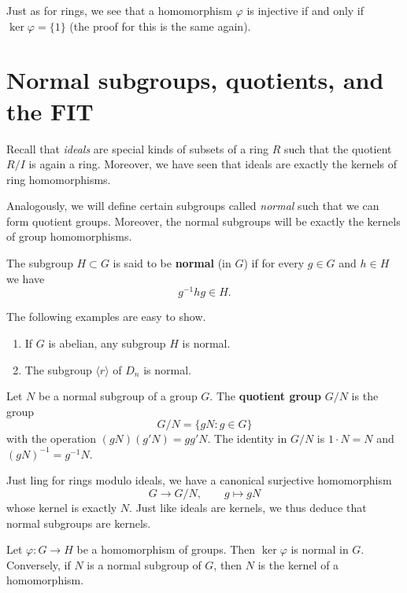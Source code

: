 
Just as for rings, we see that a homomorphism $\varphi$ is injective if and only if
$\ker{\varphi} = \{1\}$
(the proof for this is the same again).

\section{Normal subgroups, quotients, and the FIT}

Recall that \emph{ideals} are special kinds of subsets of a ring $R$
such that the quotient $R/I$ is again a ring.
Moreover, we have seen that ideals are exactly the kernels of ring homomorphisms.

Analogously, we will define certain subgroups called \emph{normal} such that we can
form quotient groups.
Moreover, the normal subgroups will be exactly the kernels of group homomorphisms.

\begin{definition}[Normal]
    The subgroup $H \subset G$ is said to be \textbf{normal} (in $G$)
    if for every $g \in G$ and $h \in H$ we have
    \[
        g^{-1} h g \in H.
    \]
\end{definition}

\begin{example}
    The following examples are easy to show.
    \begin{enumerate}
        \item If $G$ is abelian, any subgroup $H$ is normal.

        \item The subgroup $\langle r \rangle$ of $D_n$ is normal.
    \end{enumerate}
\end{example}

\begin{definition}
    Let $N$ be a normal subgroup of a group $G$.
    The \textbf{quotient group} $G/N$ is the group
    \[
        G/N = \{gN : g\in G\}
    \]
    with the operation $(gN)(g'N) = gg'N$.
    The identity in $G/N$ is $1\cdot N = N$ and $(gN)^{-1} = g^{-1}N$.
\end{definition}

Just ling for rings modulo ideals, we have a canonical surjective homomorphism
\[
    G \to G/N, \qquad g \mapsto gN
\]
whose kernel is exactly $N$.
Just like ideals are kernels, we thus deduce that normal subgroups are kernels.

\begin{lemma}[]
    Let $\varphi: G \to H$ be a homomorphism of groups.
    Then $\ker\varphi$ is normal in $G$.
    Conversely, if $N$ is a normal subgroup of $G$, 
    then $N$ is the kernel of a homomorphism.
\end{lemma}

